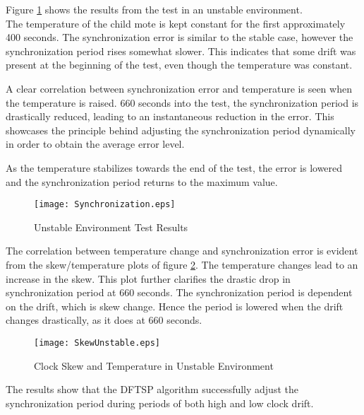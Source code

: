 \documentclass[Main]{subfiles}
\begin{document}
			 Figure \ref{fig:unstableSynchronization} shows the results from the test in an unstable environment.
			 \\The temperature of the child mote is kept constant for the first approximately 400 seconds.
			 The synchronization error is similar to the stable case, however the synchronization period rises somewhat slower.
			 This indicates that some drift was present at the beginning of the test, even though the temperature was constant. 

			 A clear correlation between synchronization error and temperature is seen when the temperature is raised.
			 660 seconds into the test, the synchronization period is drastically reduced, leading to an instantaneous reduction in the error.
			 This showcases the principle behind adjusting the synchronization period dynamically in order to obtain the average error level.

			 As the temperature stabilizes towards the end of the test, the error is lowered and the synchronization period returns to the maximum value.  

			\begin{figure}[H]
				\centering
				\texttt{[image: Synchronization.eps]}
				\caption{Unstable Environment Test Results}
				\label{fig:unstableSynchronization}
			\end{figure}

			The correlation between temperature change and synchronization error is evident from the skew/temperature plots of figure \ref{fig:SkewunStable}.
			The temperature changes lead to an increase in the skew.
			This plot further clarifies the drastic drop in synchronization period at 660 seconds.
			The synchronization period is dependent on the drift, which is skew change. 
			Hence the period is lowered when the drift changes drastically, as it does at 660 seconds.


			\begin{figure}[H]
				\centering
				\texttt{[image: SkewUnstable.eps]}
				\caption{Clock Skew and Temperature in Unstable Environment}
				\label{fig:SkewunStable}
			\end{figure}

			The results show that the DFTSP algorithm successfully adjust the synchronization period during periods of both high and low clock drift.  

	

\end{document}
